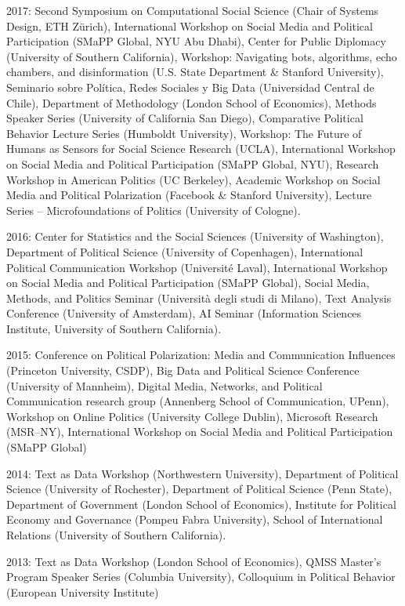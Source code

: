 \documentclass[margin,line,11pt]{resume}
\begin{document}
\begin{resume}
2017: Second Symposium on Computational Social Science (Chair of Systems Design, ETH Z\"{u}rich), International Workshop on Social Media and Political Participation (SMaPP Global, NYU Abu Dhabi), Center for Public Diplomacy (University of Southern California), Workshop: Navigating bots, algorithms, echo chambers, and disinformation (U.S. State Department \& Stanford University), Seminario sobre Pol\'{i}tica, Redes Sociales y Big Data (Universidad Central de Chile), Department of Methodology (London School of Economics), Methods Speaker Series (University of California San Diego), Comparative Political Behavior Lecture Series (Humboldt University), Workshop: The Future of Humans as Sensors for Social Science Research (UCLA),  International Workshop on Social Media and Political Participation (SMaPP Global, NYU), Research Workshop in American Politics (UC Berkeley), Academic Workshop on Social Media and Political Polarization (Facebook \& Stanford University),  Lecture Series -- Microfoundations of Politics (University of Cologne).

2016: Center for Statistics and the Social Sciences (University of Washington), Department of Political Science (University of Copenhagen), International Political Communication Workshop (Universit\'{e} Laval), International Workshop on Social Media and Political Participation (SMaPP Global), Social Media, Methods, and Politics Seminar (Universit\`{a} degli studi di Milano), Text Analysis Conference (University of Amsterdam), AI Seminar (Information Sciences Institute, University of Southern California).

2015: Conference on Political Polarization: Media and Communication Influences (Princeton University, CSDP), Big Data and Political Science Conference (University of Mannheim), Digital Media, Networks, and Political Communication research group (Annenberg School of Communication, UPenn), Workshop on Online Politics (University College Dublin), Microsoft Research (MSR--NY), International Workshop on Social Media and Political Participation (SMaPP Global)

2014: Text as Data Workshop (Northwestern University), Department of Political Science (University of Rochester), Department of Political Science (Penn State), Department of Government (London School of Economics), Institute for Political Economy and Governance (Pompeu Fabra University), School of International Relations (University of Southern California).

2013: Text as Data Workshop (London School of Economics), QMSS Master's Program Speaker Series (Columbia University), Colloquium in Political Behavior (European University Institute)


\end{resume}
\end{document}
